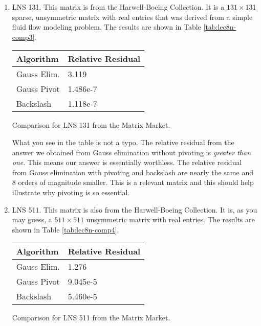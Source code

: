 \begin{enumerate}
\item LNS 131.  This matrix is from the Harwell-Boeing Collection.  It is a $131 \times 131$ sparse, unsymmetric matrix with real entries that was derived from a simple fluid flow modeling problem. The results are shown in Table \ref{tab:lec8n-comp3}.  %
\begin{margintable}
\begin{tabular}{|l | l |}
\hline
\textbf{Algorithm} & \textbf{Relative Residual} \\ \hline
Gauss Elim. & 3.119 \\ \hline
Gauss Pivot & 1.486e-7 \\ \hline
Backslash & 1.118e-7 \\ \hline
\end{tabular}
\caption{Comparison for LNS 131 from the Matrix Market.}
\label{tab:lec8n-comp3}
\end{margintable}
What you see in the table is not a typo.  The relative residual from the answer we obtained from Gauss elimination without pivoting is \emph{greater than one}.  This means our answer is essentially worthless.  The relative residual from Gauss elimination with pivoting and backslash are nearly the same and 8 orders of magnitude smaller.  This is a relevant matrix and this should help illustrate why pivoting is so essential.  

\item LNS 511.  This matrix is also from the Harwell-Boeing Collection.  It is, as you may guess, a $511 \times 511$ unsymmetric matrix with real entries.  The results are shown in Table \ref{tab:lec8n-comp4}.
\begin{margintable}
\begin{tabular}{|l | l |}
\hline
\textbf{Algorithm} & \textbf{Relative Residual} \\ \hline
Gauss Elim. & 1.276 \\ \hline
Gauss Pivot & 9.045e-5 \\ \hline
Backslash & 5.460e-5 \\ \hline
\end{tabular}
\caption{Comparison for LNS 511 from the Matrix Market.}
\label{tab:lec8n-comp4}
\end{margintable}
\end{enumerate}
